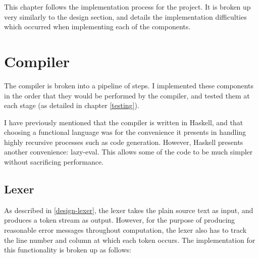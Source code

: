 This chapter follows the implementation process for the project. It is broken up
very similarly to the design section, and details the implementation
difficulties which occurred when implementing each of the components.

\section{Compiler}

The compiler is broken into a pipeline of steps. I implemented these components
in the order that they would be performed by the compiler, and tested them at
each stage (as detailed in chapter \ref{testing}).

I have previously mentioned that the compiler is written in Haskell, and that
choosing a functional language was for the convenience it presents in handling
highly recursive processes such as code generation. However, Haskell presents
another convenience: \gls{lazy-eval}. This allows some of the code to be much
simpler without sacrificing performance.

\subsection{Lexer}

As described in \ref{design-lexer}, the lexer takes the plain source text as
input, and produces a token stream as output. However, for the purpose of
producing reasonable error messages throughout computation, the lexer also has
to track the line number and column at which each token occurs. The
implementation for this functionality is broken up as follows:

